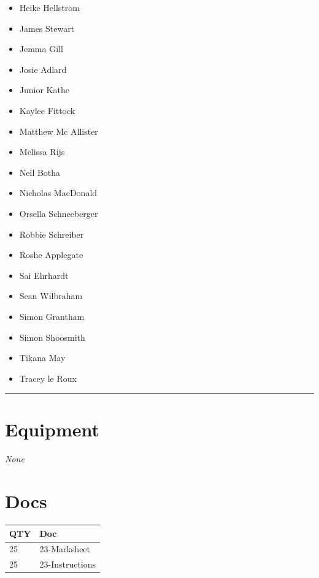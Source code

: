 \documentclass[10pt]{article}
\begin{document}
\begin{multicols}{2}
		\begin{itemize}
									\item Heike Hellstrom
									\item James Stewart
									\item Jemma Gill
									\item Josie Adlard
									\item Junior Kathe
									\item Kaylee Fittock
									\item Matthew Mc Allister
									\item Melissa Rijs
									\item Neil Botha
									\item Nicholas MacDonald
									\item Orsella Schneeberger
									\item Robbie Schreiber
									\item Roshe Applegate
									\item Sai Ehrhardt
									\item Sean Wilbraham
									\item Simon Grantham
									\item Simon Shoosmith
									\item Tikana May
									\item Tracey le Roux
						\end{itemize}

		\vfill\null

		\end{multicols}



			\vspace{0.5cm}
	\hrule
	\vspace{0.5cm}

	\begin{multicols}{2}

		\section*{\faWrench \: Equipment}

				\textit{None}
		
		\vfill\null
		\columnbreak

			\section*{\faFile \: Docs}
		 	\begin{center}
			\begin{tabular}{p{2cm}p{4cm}}

			\textbf{QTY} & \textbf{Doc} \\\toprule
										25&23-Marksheet\\\midrule
										25&23-Instructions\\\midrule
							\end{tabular}
			\end{center}
	

		\vfill\null

		\end{multicols}
\end{document}
